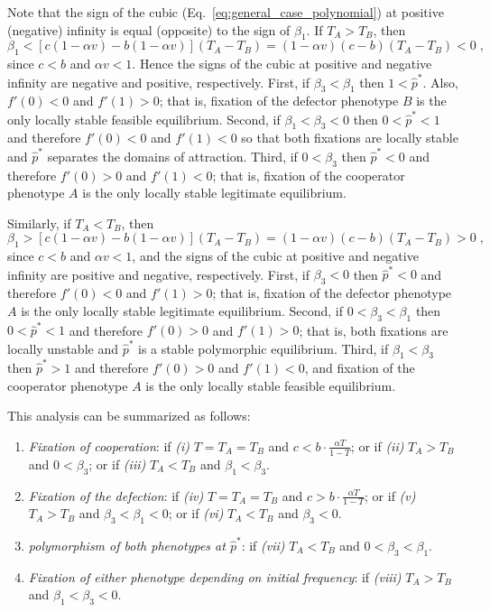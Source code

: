 \documentclass[12pt]{extarticle}
\begin{document}
\begin{appendices}
Note that the sign of the cubic (Eq.\ \ref{eq:general_case_polynomial}) at positive (negative) infinity is equal (opposite) to the sign of $\beta_1$. 
If $T_A>T_B$, then 
\begin{equation} \label{eq:beta1}
   \beta_1 < [c(1-\alpha v) - b(1-\alpha v)] (T_A-T_B) 
   = (1-\alpha v)(c-b)(T_A-T_B) < 0 \;,
 \end{equation}
since $c<b$ and $\alpha v < 1$. Hence the signs of the cubic at positive and negative infinity are negative and positive, respectively.
First, if $\beta_3<\beta_1$ then 
$1<\hat{p}^*$. Also, $f'(0)<0$ and $f'(1)>0$; that is, fixation of the defector phenotype $B$ is the only locally stable feasible equilibrium.
Second, if $\beta_1<\beta_3<0$ then 
$0<\hat{p}^*<1$ and therefore $f'(0)<0$ and $f'(1)<0$ so that both fixations are locally stable and $\hat{p}^*$ separates the domains of attraction.
Third, if $0<\beta_3$ then 
$\hat{p}^*<0$ and therefore $f'(0)>0$ and $f'(1)<0$; that is, fixation of the cooperator phenotype $A$ is the only locally stable legitimate equilibrium.

Similarly, if $T_A<T_B$, then
\begin{equation} \label{eq:beta1_rev}
   \beta_1 > [c(1-\alpha v) - b(1-\alpha v)] (T_A-T_B) 
   = (1-\alpha v)(c-b)(T_A-T_B) > 0 \;,
 \end{equation}
since $c<b$ and $\alpha v < 1$, and the signs of the cubic at positive and negative infinity are positive and negative, respectively. 
First, if $\beta_3<0$ then $\hat{p}^*<0$ and therefore $f'(0)<0$ and $f'(1)>0$; that is, fixation of the defector phenotype $A$ is the only locally stable legitimate equilibrium.
Second, if $0<\beta_3<\beta_1$ then $0<\hat{p}^*<1$ and therefore $f'(0)>0$ and $f'(1)>0$; that is, both fixations are locally unstable and $\hat{p}^*$ is a stable polymorphic equilibrium.
Third, if $\beta_1<\beta_3$ then $\hat{p}^*>1$ and therefore $f'(0)>0$ and $f'(1)<0$, and fixation of the cooperator phenotype $A$ is the only locally stable feasible equilibrium.

This analysis can be summarized as follows:
\begin{enumerate}
\item \emph{Fixation of cooperation}: 
	if \emph{(i)} $T=T_A=T_B$ and $c < b\cdot \frac{\alpha T}{1-T}$; or
	if \emph{(ii)} $T_A>T_B$ and $0<\beta_3$; or 
	if \emph{(iii)} $T_A<T_B$ and $\beta_1<\beta_3$.
\item \emph{Fixation of the defection}: 
	if \emph{(iv)}  $T=T_A=T_B$ and $c > b\cdot \frac{\alpha T}{1-T}$; or 
	if \emph{(v)} $T_A>T_B$ and $\beta_3<\beta_1<0$; or 
	if \emph{(vi)} $T_A<T_B$ and $\beta_3<0$.
\item \emph{polymorphism of both phenotypes at $\hat{p}^*$}: 
	if \emph{(vii)} $T_A < T_B$ and $0<\beta_3<\beta_1$.
\item \emph{Fixation of either phenotype depending on initial frequency}:
	if \emph{(viii)}  $T_A>T_B$ and $\beta_1<\beta_3<0$.
\end{enumerate}


\end{appendices}
\end{document}
